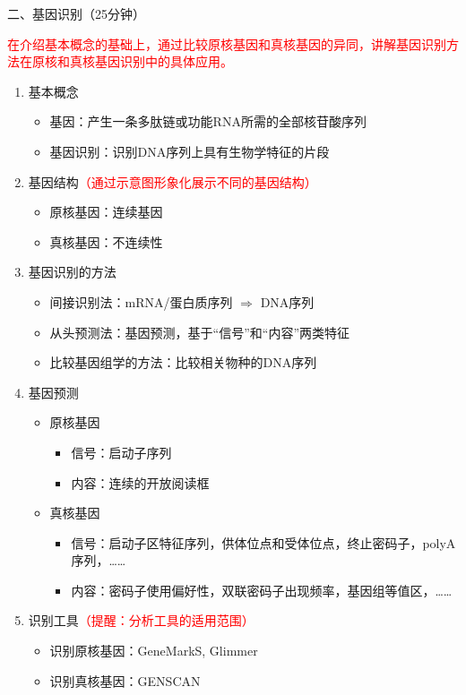 \documentclass{TIJMUjiaoanLL}
\begin{document}
\noindent
二、基因识别（25分钟）

\textcolor{red}{在介绍基本概念的基础上，通过比较原核基因和真核基因的异同，讲解基因识别方法在原核和真核基因识别中的具体应用。}
\begin{enumerate}
  \item 基本概念
    \begin{itemize}
      \item 基因：产生一条多肽链或功能RNA所需的全部核苷酸序列
      \item 基因识别：识别DNA序列上具有生物学特征的片段
    \end{itemize}
  \item 基因结构\textcolor{red}{（通过示意图形象化展示不同的基因结构）}
    \begin{itemize}
      \item 原核基因：连续基因
      \item 真核基因：不连续性
    \end{itemize}
  \item 基因识别的方法
    \begin{itemize}
      \item 间接识别法：mRNA/蛋白质序列 $\Rightarrow$ DNA序列
      \item 从头预测法：基因预测，基于“信号”和“内容”两类特征
      \item 比较基因组学的方法：比较相关物种的DNA序列
    \end{itemize}
  \item 基因预测
    \begin{itemize}
      \item 原核基因 
	\begin{itemize}
	  \item 信号：启动子序列
	  \item 内容：连续的开放阅读框
	\end{itemize}
      \item 真核基因
	\begin{itemize}
	  \item 信号：启动子区特征序列，供体位点和受体位点，终止密码子，polyA序列，……
	  \item 内容：密码子使用偏好性，双联密码子出现频率，基因组等值区，……
	\end{itemize}
    \end{itemize}
  \item 识别工具\textcolor{red}{（提醒：分析工具的适用范围）}
    \begin{itemize}
      \item 识别原核基因：GeneMarkS, Glimmer
      \item 识别真核基因：GENSCAN
    \end{itemize}
\end{enumerate}
\end{document}
